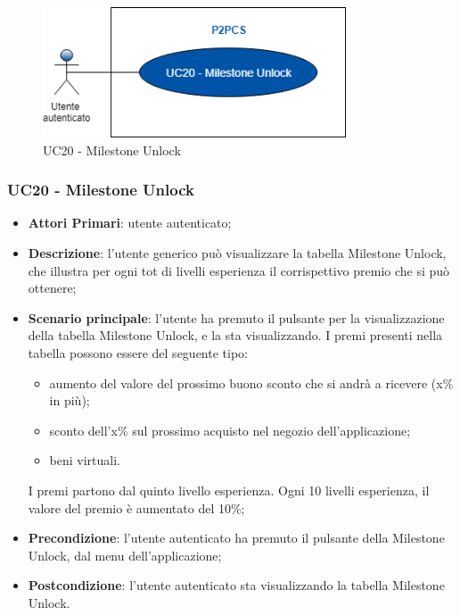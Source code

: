 \begin{figure}[h]
	\includegraphics[width=9cm]{res/images/uc20-21.png}
	\centering
	\caption{UC20 - Milestone Unlock}
\end{figure}
\subsubsection{UC20 - Milestone Unlock}
\begin{itemize}
	\item \textbf{Attori Primari}: utente autenticato;
	\item \textbf{Descrizione}: l'utente generico può visualizzare la tabella Milestone Unlock\glo, che illustra per ogni tot di livelli esperienza il corrispettivo premio che si può ottenere;	
	\item \textbf{Scenario principale}: l'utente ha premuto il pulsante per la visualizzazione della tabella Milestone Unlock, e la sta visualizzando.
	I premi presenti nella tabella possono essere del seguente tipo:
	\begin{itemize}
		\item aumento del valore del prossimo buono sconto che si andrà a ricevere (x\% in più);
		\item sconto dell'x\% sul prossimo acquisto nel negozio dell'applicazione;
		\item beni virtuali.
	\end{itemize}
	I premi partono dal quinto livello esperienza.
	Ogni 10 livelli esperienza, il valore del premio è aumentato del 10\%;
	\item \textbf{Precondizione}: l'utente autenticato ha premuto il pulsante della Milestone Unlock, dal menu dell'applicazione;
	\item \textbf{Postcondizione}: l'utente autenticato sta visualizzando la tabella Milestone Unlock.
\end{itemize}
